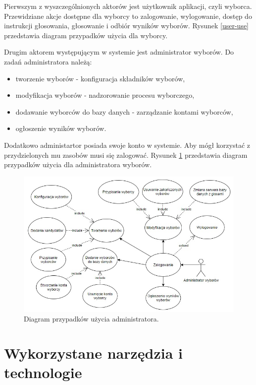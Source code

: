 \documentclass[a4paper,12pt]{book}
\begin{document}
Pierwszym z wyszczególnionych aktorów jest użytkownik aplikacji, czyli wyborca. Przewidziane akcje dostępne dla wyborcy to zalogowanie, wylogowanie, dostęp do instrukcji głosowania, głosowanie i odbiór wyników wyborów. Rysunek \ref{user-use} przedstawia diagram przypadków użycia dla wyborcy.

Drugim aktorem występującym w systemie jest administrator wyborów. Do zadań administratora należą: 

\begin{itemize}
	\item tworzenie wyborów - konfiguracja składników wyborów,
	\item modyfikacja wyborów - nadzorowanie procesu wyborczego,
	\item dodawanie wyborców do bazy danych - zarządzanie kontami wyborców,
	\item ogłoszenie wyników wyborów.
\end{itemize}

Dodatkowo administartor posiada swoje konto w systemie. Aby mógł korzystać z przydzielonych mu zasobów musi się zalogować. Rysunek \ref{admin-use} przedstawia diagram przypadków użycia dla administratora wyborów.

\begin{figure}[h]
	\centering
	\includegraphics[width=\textwidth]{images/admin_use_case.jpg}
	\caption{Diagram przypadków użycia administratora.}\label{admin-use}
\end {figure}

\newpage
\section {Wykorzystane narzędzia i technologie}
\end{document}

